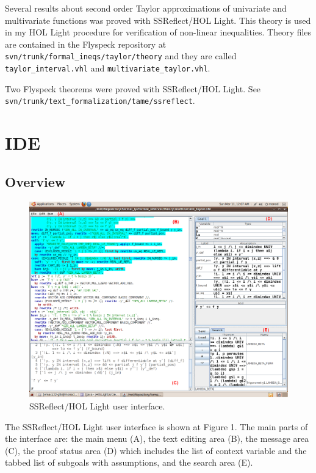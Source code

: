 \documentclass[a4paper]{article}
\begin{document}
Several results about second order Taylor approximations of univariate and multivariate functions was proved with SSReflect/HOL Light. This theory is used in my HOL Light procedure for verification of non-linear inequalities. Theory files are contained in the Flyspeck repository at {\tt svn/trunk/formal\_ineqs/taylor/theory} and they are called {\tt taylor\_interval.vhl} and {\tt multivariate\_taylor.vhl}.

Two Flyspeck theorems were proved with SSReflect/HOL Light. See\\[0pt]
{\tt svn/trunk/text\_formalization/tame/ssreflect}.


\section{IDE}

\subsection{Overview}
\begin{figure}
\label{gui}
\includegraphics[width=\textwidth]{Screenshot.png}
\caption{SSReflect/HOL Light user interface.}
\end{figure}

The SSReflect/HOL Light user interface is shown at Figure 1. The main parts of the interface are: the main menu (A), the text editing area (B), the message area (C), the proof status area (D) which includes the list of context variable and the tabbed list of subgoals with assumptions, and the search area (E).
\end{document}
